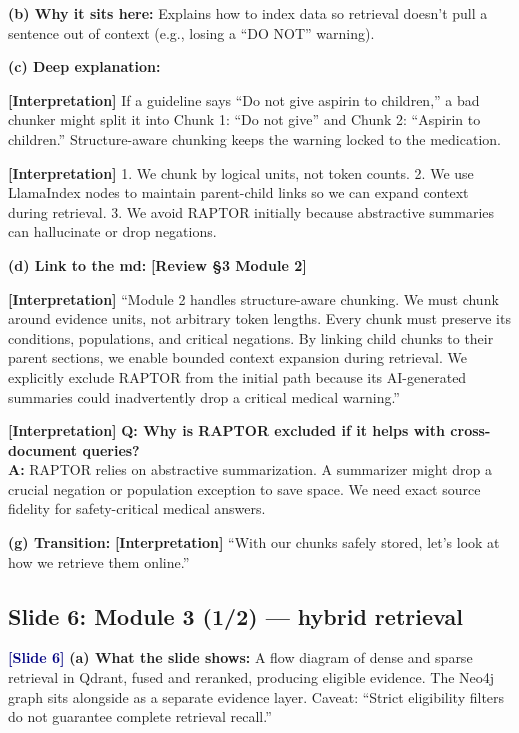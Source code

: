 \documentclass[11pt,a4paper]{article}
\newcommand{\origintag}[2]{\textcolor{#1}{\small\textbf{[#2]}}}
\begin{document}
\textbf{(b) Why it sits here:} Explains how to index data so retrieval doesn't pull a sentence out of context (e.g., losing a ``DO NOT'' warning).

\textbf{(c) Deep explanation:}
\begin{analogy}
\origintag{slate}{Interpretation} If a guideline says ``Do not give aspirin to children,'' a bad chunker might split it into Chunk 1: ``Do not give'' and Chunk 2: ``Aspirin to children.'' Structure-aware chunking keeps the warning locked to the medication.
\end{analogy}
\origintag{slate}{Interpretation} 1. We chunk by logical units, not token counts. 2. We use LlamaIndex nodes to maintain parent-child links so we can expand context during retrieval. 3. We avoid RAPTOR initially because abstractive summaries can hallucinate or drop negations.

\textbf{(d) Link to the md:} \origintag{amber}{Review \S3 Module 2}

\begin{sayit}
\origintag{slate}{Interpretation} ``Module 2 handles structure-aware chunking. We must chunk around evidence units, not arbitrary token lengths. Every chunk must preserve its conditions, populations, and critical negations. By linking child chunks to their parent sections, we enable bounded context expansion during retrieval. We explicitly exclude RAPTOR from the initial path because its AI-generated summaries could inadvertently drop a critical medical warning.''
\end{sayit}

\begin{qa}
\origintag{slate}{Interpretation} \textbf{Q: Why is RAPTOR excluded if it helps with cross-document queries?} \\
\textbf{A:} RAPTOR relies on abstractive summarization. A summarizer might drop a crucial negation or population exception to save space. We need exact source fidelity for safety-critical medical answers.
\end{qa}
\textbf{(g) Transition:} \origintag{slate}{Interpretation} ``With our chunks safely stored, let's look at how we retrieve them online.''
\subsection{Slide 6: Module 3 (1/2) --- hybrid retrieval}
\origintag{navy}{Slide 6}
\textbf{(a) What the slide shows:} A flow diagram of dense and sparse retrieval in Qdrant, fused and reranked, producing eligible evidence. The Neo4j graph sits alongside as a separate evidence layer. Caveat: ``Strict eligibility filters do not guarantee complete retrieval recall.''
\end{document}
